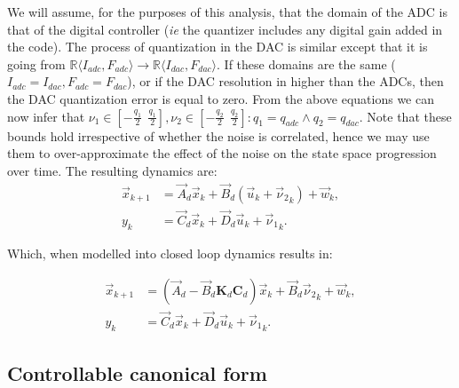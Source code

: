 \documentclass[runningheads,a4paper]{llncs}
\newcommand{\mat}[1]{\boldsymbol{#1}}
\begin{document}
We will assume, for the purposes of this analysis, that the domain of the ADC is that of the digital controller (\emph{ie} the quantizer includes any digital gain added in the code).
The process of quantization in the DAC is similar except that it is going from $\mathbb{R}\langle I_{adc},F_{adc} \rangle \rightarrow \mathbb{R}\langle I_{dac},F_{dac} \rangle$. If these domains are the same ($I_{adc}=I_{dac},F_{adc}=F_{dac}$), or if the DAC resolution in higher than the ADCs, then the DAC quantization error is equal to zero.
From the above equations we can now infer that $\nu_1 \in [-\frac{q_1}{2}\ \ \frac{q_1}{2}], \nu_2 \in [-\frac{q_2}{2}\ \ \frac{q_2}{2}] : q_1=q_{adc} \wedge q_2=q_{dac}$.
Note that these bounds hold irrespective of whether the noise is correlated, hence we may use them to over-approximate the effect of the noise on the state space progression over time.
The resulting dynamics are:
\begin{align}
\label{eq:pre_quantization}
\vec{x}_{k+1} &= \vec{A}_d\vec{x}_k+\vec{B}_d(\vec{u}_k+{\vec{\nu}_2}_k) + \vec{w}_k,\\
y_k &= \vec{C}_d \vec{x}_ k + \vec{D}_d \vec{u}_ k+{\vec{\nu}_1}_k. 
\end{align}

Which, when modelled into closed loop dynamics results in:

\begin{align}
\label{eq:quantization}
\vec{x}_{k+1} &= (\vec{A}_d-\vec{B}_d\mat{K}_d\mat{C}_d) \vec{x}_k+\vec{B}_d{\vec{\nu}_2}_k + \vec{w}_k,\\
y_k &= \vec{C}_d \vec{x}_ k + \vec{D}_d \vec{u}_ k+{\vec{\nu}_1}_k. 
\end{align}

\subsection{Controllable canonical form} \label{sec:reachable}
\end{document}
